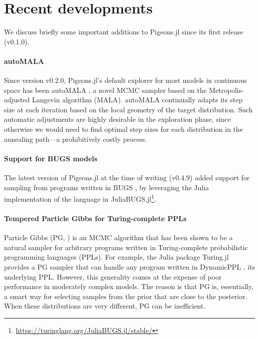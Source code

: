 \section{Recent developments}

We discuss briefly some important additions to Pigeons.jl since its first release
(v0.1.0).

\vspace{-1em}

\paragraph{autoMALA}
Since version v0.2.0, Pigeons.jl's default explorer for most models in continuous
space has been autoMALA \citep{biron2024automala}, a novel MCMC sampler
based on the Metropolis-adjusted Langevin algorithm (MALA). autoMALA continually
adapts its step size at each iteration based on the local geometry of the target
distribution. Such automatic adjustments are highly desirable in the exploration 
phase, since otherwise we would 
need to find optimal step sizes for each distribution in the annealing path---a 
prohibitively costly process.

\vspace{-1em}

\paragraph{Support for BUGS models}
The latest version of Pigeons.jl at the time of writing (v0.4.9) added support 
for sampling from programs written in BUGS \cite{lunn2000winbugs,lunn2009bugs,
lunn2013bugs}, by leveraging the Julia implementation of the 
language in JuliaBUGS.jl\footnote{\url{https://turinglang.org/JuliaBUGS.jl/stable/}}.

\vspace{-1em}

\paragraph{Tempered Particle Gibbs for Turing-complete PPLs}
Particle Gibbs (PG, \citealp{andrieu2010particle}) is an MCMC
algorithm that has been shown \citep{wood2014new} to be a natural sampler for
arbitrary programs written in Turing-complete probabilistic programming 
languages (PPLs). For example, the Julia package Turing.jl \citep{ge2018turing}
provides a PG sampler that can handle any program written in DynamicPPL
\citep{tarek2020dynamicppl}, its underlying PPL.
However, this generality comes at the expense of poor performance in moderately
complex models. The reason is that PG is, essentially, a smart 
way for selecting samples from the prior that are close to the posterior.
When these distributions are very different, PG can be inefficient.

